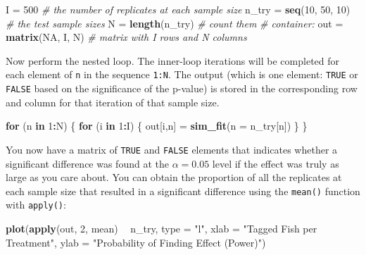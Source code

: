 \documentclass[]{book}
\newenvironment{Shaded}{\begin{snugshade}}{\end{snugshade}}
\newcommand{\CommentTok}[1]{\textcolor[rgb]{0.56,0.35,0.01}{\textit{#1}}}
\newcommand{\ControlFlowTok}[1]{\textcolor[rgb]{0.13,0.29,0.53}{\textbf{#1}}}
\newcommand{\DataTypeTok}[1]{\textcolor[rgb]{0.13,0.29,0.53}{#1}}
\newcommand{\DecValTok}[1]{\textcolor[rgb]{0.00,0.00,0.81}{#1}}
\newcommand{\KeywordTok}[1]{\textcolor[rgb]{0.13,0.29,0.53}{\textbf{#1}}}
\newcommand{\NormalTok}[1]{#1}
\newcommand{\OperatorTok}[1]{\textcolor[rgb]{0.81,0.36,0.00}{\textbf{#1}}}
\newcommand{\OtherTok}[1]{\textcolor[rgb]{0.56,0.35,0.01}{#1}}
\newcommand{\StringTok}[1]{\textcolor[rgb]{0.31,0.60,0.02}{#1}}
\begin{document}
\begin{Shaded}
\begin{Highlighting}[]
\NormalTok{I =}\StringTok{ }\DecValTok{500}  \CommentTok{# the number of replicates at each sample size}
\NormalTok{n_try =}\StringTok{ }\KeywordTok{seq}\NormalTok{(}\DecValTok{10}\NormalTok{, }\DecValTok{50}\NormalTok{, }\DecValTok{10}\NormalTok{)  }\CommentTok{# the test sample sizes}
\NormalTok{N =}\StringTok{ }\KeywordTok{length}\NormalTok{(n_try)        }\CommentTok{# count them}
\CommentTok{# container: }
\NormalTok{out =}\StringTok{ }\KeywordTok{matrix}\NormalTok{(}\OtherTok{NA}\NormalTok{, I, N) }\CommentTok{# matrix with I rows and N columns}
\end{Highlighting}
\end{Shaded}

Now perform the nested loop. The inner-loop iterations will be completed for each element of \texttt{n} in the sequence \texttt{1:N}. The output (which is one element: \texttt{TRUE} or \texttt{FALSE} based on the significance of the p-value) is stored in the corresponding row and column for that iteration of that sample size.

\begin{Shaded}
\begin{Highlighting}[]
\ControlFlowTok{for}\NormalTok{ (n }\ControlFlowTok{in} \DecValTok{1}\OperatorTok{:}\NormalTok{N) \{}
  \ControlFlowTok{for}\NormalTok{ (i }\ControlFlowTok{in} \DecValTok{1}\OperatorTok{:}\NormalTok{I) \{}
\NormalTok{    out[i,n] =}\StringTok{ }\KeywordTok{sim_fit}\NormalTok{(}\DataTypeTok{n =}\NormalTok{ n_try[n])}
\NormalTok{  \}}
\NormalTok{\}}
\end{Highlighting}
\end{Shaded}

You now have a matrix of \texttt{TRUE} and \texttt{FALSE} elements that indicates whether a significant difference was found at the \(\alpha = 0.05\) level if the effect was truly as large as you care about. You can obtain the proportion of all the replicates at each sample size that resulted in a significant difference using the \texttt{mean()} function with \texttt{apply()}:

\begin{Shaded}
\begin{Highlighting}[]
\KeywordTok{plot}\NormalTok{(}\KeywordTok{apply}\NormalTok{(out, }\DecValTok{2}\NormalTok{, mean) }\OperatorTok{~}\StringTok{ }\NormalTok{n_try, }\DataTypeTok{type =} \StringTok{"l"}\NormalTok{,}
     \DataTypeTok{xlab =} \StringTok{"Tagged Fish per Treatment"}\NormalTok{,}
     \DataTypeTok{ylab =} \StringTok{"Probability of Finding Effect (Power)"}\NormalTok{)}
\end{Highlighting}
\end{Shaded}
\end{document}
